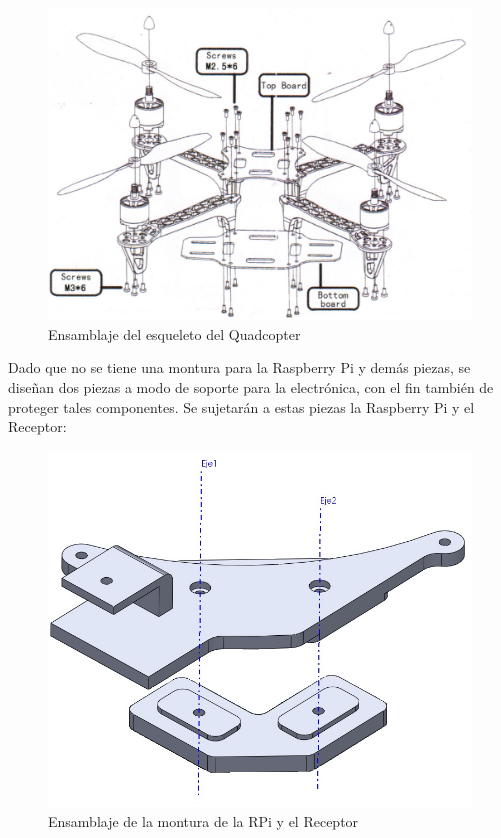 \documentclass[twoside,11pt]{report}
\begin{document}
\begin{figure}[h!]
\begin{center}
\includegraphics[scale=0.3]{images/frame_mount.jpg}
\end{center}
\caption{Ensamblaje del esqueleto del Quadcopter}
\end{figure}

Dado que no se tiene una montura para la Raspberry Pi y demás piezas, se diseñan dos piezas a modo de soporte para la electrónica, con el fin también de proteger tales componentes. Se sujetarán a estas piezas la Raspberry Pi y el Receptor: \\

\begin{figure}[h!]
\begin{center}
\includegraphics[scale=0.35]{images/ensamblaje_rpi_mount.jpg}
\end{center}
\caption{Ensamblaje de la montura de la RPi y el Receptor}
\end{figure}
\end{document}
